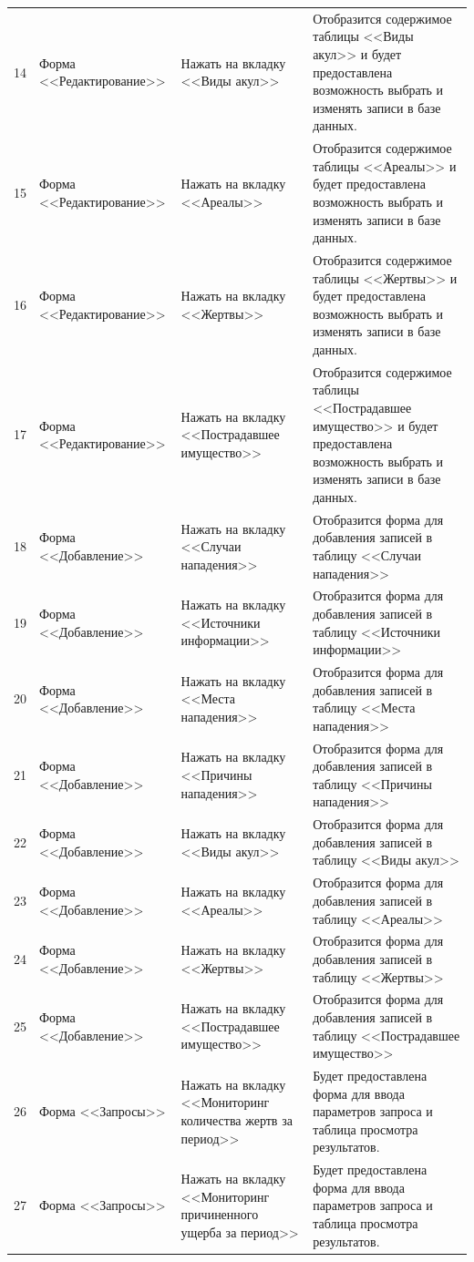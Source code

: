 \documentclass[russian,utf8,simple,emptystyle]{eskdtext}
\begin{document}
\begin{longtable}{c | L{3cm} | L{6cm} | L{6cm} }
	14 & Форма <<Редактирование>> & Нажать на вкладку <<Виды акул>> & Отобразится содержимое таблицы <<Виды акул>> и будет предоставлена возможность выбрать и изменять записи в базе данных. \\
	15 & Форма <<Редактирование>> & Нажать на вкладку <<Ареалы>> & Отобразится содержимое таблицы <<Ареалы>> и будет предоставлена возможность выбрать и изменять записи в базе данных. \\
	16 & Форма <<Редактирование>> & Нажать на вкладку <<Жертвы>> & Отобразится содержимое таблицы <<Жертвы>> и будет предоставлена возможность выбрать и изменять записи в базе данных. \\
	17 & Форма <<Редактирование>> & Нажать на вкладку <<Пострадавшее имущество>> & Отобразится содержимое таблицы <<Пострадавшее имущество>> и будет предоставлена возможность выбрать и изменять записи в базе данных. \\
	18 & Форма <<Добавление>> & Нажать на вкладку <<Случаи нападения>> & Отобразится форма для добавления записей в таблицу <<Случаи нападения>> \\
	19 & Форма <<Добавление>> & Нажать на вкладку <<Источники информации>> & Отобразится форма для добавления записей в таблицу <<Источники информации>> \\
	20 & Форма <<Добавление>> & Нажать на вкладку <<Места нападения>> & Отобразится форма для добавления записей в таблицу <<Места нападения>> \\
	21 & Форма <<Добавление>> & Нажать на вкладку <<Причины нападения>> & Отобразится форма для добавления записей в таблицу <<Причины нападения>> \\
	22 & Форма <<Добавление>> & Нажать на вкладку <<Виды акул>> & Отобразится форма для добавления записей в таблицу <<Виды акул>> \\
	23 & Форма <<Добавление>> & Нажать на вкладку <<Ареалы>> & Отобразится форма для добавления записей в таблицу <<Ареалы>> \\
	24 & Форма <<Добавление>> & Нажать на вкладку <<Жертвы>> & Отобразится форма для добавления записей в таблицу <<Жертвы>> \\
	25 & Форма <<Добавление>> & Нажать на вкладку <<Пострадавшее имущество>> & Отобразится форма для добавления записей в таблицу <<Пострадавшее имущество>> \\
	26 & Форма <<Запросы>> & Нажать на вкладку <<Мониторинг количества жертв за период>> & Будет предоставлена форма для ввода параметров запроса и таблица просмотра результатов. \\
	27 & Форма <<Запросы>> & Нажать на вкладку <<Мониторинг причиненного ущерба за период>> & Будет предоставлена форма для ввода параметров запроса и таблица просмотра результатов. \\

\end{longtable}
\end{document}
